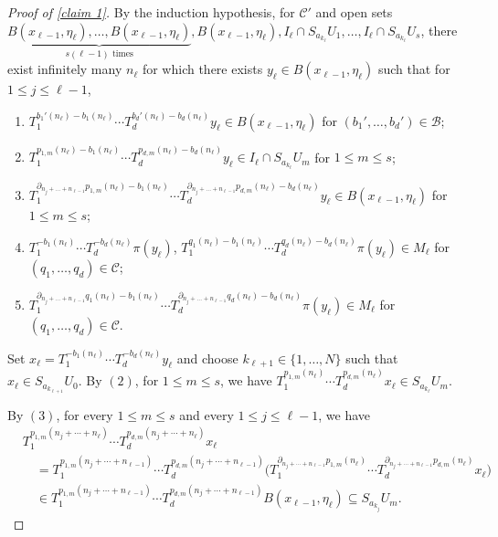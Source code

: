\documentclass[10pt,a4paper]{amsart}
\newcommand{\cB}{{\mathcal B}}
\newcommand{\cC}{{\mathcal C}}
\begin{document}
\begin{proof}[Proof of \cref{claim 1}]
    By the induction hypothesis, for $\cC'$ and open sets $\underbrace{B(x_{\ell-1},\eta_{\ell}),\dots, B(x_{\ell-1},\eta_{\ell})}_{s(\ell-1)\text{ times}},B(x_{\ell-1},\eta_{\ell}),I_{\ell}\cap S_{a_{k_{\ell}}}U_1,\dots,I_{\ell}\cap S_{a_{k_{\ell}}}U_s$, there exist infinitely many $n_\ell$ for which there exists $y_\ell\in B(x_{\ell-1},\eta_{\ell})$ such that for $1\leq j \leq \ell-1$,\begin{enumerate}
        \item $T_{1}^{b_1'(n_\ell)-b_1(n_\ell)}\cdots T_{d}^{b_d'(n_\ell)-b_d(n_\ell)}y_\ell \in B(x_{\ell-1},\eta_{\ell})$ for $(b_1',\dots,b_d')\in \cB$;
        \item $T_{1}^{p_{1,m}(n_\ell)-b_1(n_\ell)}\cdots T_{d}^{p_{d,m}(n_\ell)-b_d(n_\ell)}y_\ell \in I_\ell \cap S_{a_{k_\ell}}U_m$ for $1\leq m \leq s$;
        \item $T_1^{\partial_{n_j+\dots+n_{\ell-1}}p_{1,m}(n_\ell)-b_1(n_\ell)} \cdots T_d^{\partial_{n_j+\dots+n_{\ell-1}}p_{d,m}(n_\ell)-b_d(n_\ell)}y_\ell \in B(x_{\ell-1},\eta_\ell)$ for $1\leq m\leq s$;
        \item $T_1^{-b_1(n_\ell)}\cdots T_d^{-b_d(n_\ell)}\pi(y_\ell)$, $T_{1}^{q_1(n_\ell)-b_1(n_\ell)}\cdots T_{d}^{q_d(n_\ell)-b_d(n_\ell)}\pi(y_\ell)\in M_{\ell}$ for $(q_1,\dots,q_d)\in \cC$;
        \item $T_1^{\partial_{n_j+\dots+n_{\ell-1}}q_1(n_\ell)-b_1(n_\ell)}\cdots T_d^{\partial_{n_j+\dots+n_{\ell-1}}q_d(n_\ell)-b_d(n_\ell)}\pi(y_\ell)\in M_{\ell}$ for $(q_1,\dots,q_d)\in \cC$.
    \end{enumerate}

    Set $x_{\ell} = T_{1}^{-b_1(n_\ell)}\cdots T_d^{-b_d(n_\ell)}y_{\ell}$ and choose $k_{\ell+1}\in \{1,\dots,N\}$ such that $x_\ell\in S_{a_{k_{\ell+1}}}U_0$. By $(2)$, for $1\leq m\leq s$, we have $T_{1}^{p_{1,m}(n_\ell)}\cdots T_d^{p_{d,m}(n_\ell)}x_\ell\in S_{a_{k_\ell}}U_m$.

    By $(3)$, for every $1\leq m\leq s$ and every $1\leq j \leq \ell-1$, we have\begin{align*}
&T_1^{p_{1,m}(n_j+\cdots+n_\ell)}\cdots 
 T_d^{p_{d,m}(n_j+\cdots+n_\ell)}x_\ell       \\
&\quad =
T_1^{p_{1,m}(n_j+\cdots+n_{\ell-1})}\cdots 
T_d^{p_{d,m}(n_j+\cdots+n_{\ell-1})} 
\Big(
T_1^{\partial_{n_j+\cdots+n_{\ell-1}}p_{1,m}(n_\ell)}\cdots 
T_d^{\partial_{n_j+\cdots+n_{\ell-1}}p_{d,m}(n_\ell)}
x_\ell
\Big)                                        \\
&\quad \in
T_1^{p_{1,m}(n_j+\cdots+n_{\ell-1})}\cdots
T_d^{p_{d,m}(n_j+\cdots+n_{\ell-1})}
B(x_{\ell-1},\eta_\ell)   \subseteq S_{a_{k_j}}U_m .
\end{align*}


\end{proof}
\end{document}
